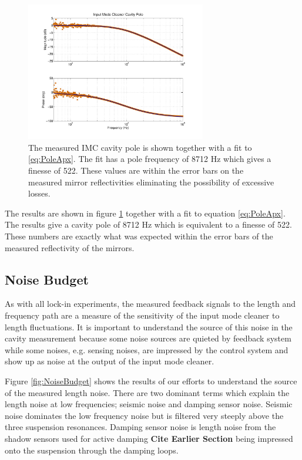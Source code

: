 \begin{figure}[ht]
	\centering
	\includegraphics[width = 0.7\textwidth, trim = 2.5cm 1.5cm 2.5cm 1cm]{Cavity_Pole.pdf}
	\caption{The measured IMC cavity pole is shown together with a fit 
		to \eqref{eq:PoleApx}.  The fit has a pole frequency of 8712 Hz 
		which gives a finesse of 522.  These values are within the error 
		bars on the measured mirror reflectivities eliminating the 
		possibility of excessive losses.}
	\label{fig:cavPole}
\end{figure}

The results are shown in figure \ref{fig:cavPole} together with a fit to equation 
\eqref{eq:PoleApx}.  The results give a cavity pole of 8712 Hz which is equivalent 
to a finesse of 522.  
These numbers are exactly what was expected within the error bars of the measured 
reflectivity of the mirrors.  

\subsection{Noise Budget}

As with all lock-in experiments, the measured feedback signals to the length and 
frequency path are a measure of the sensitivity of the input mode cleaner to length 
fluctuations.  
It is important to understand the source of this noise in the cavity measurement because 
some noise sources are quieted by feedback system while some noises, e.g. sensing noises, 
are impressed by the control system and show up
as noise at the output of the input mode cleaner.  

Figure \ref{fig:NoiseBudget} shows the results of our efforts to understand the source 
of the measured length noise.  
There are two dominant terms which explain the length noise at low frequencies; 
seismic noise and damping sensor noise.  
Seismic noise dominates the low frequency noise but is filtered very steeply above the 
three suspension resonances.  
Damping sensor noise is length noise from the shadow sensors used for active damping
\textbf{Cite Earlier Section} being impressed onto the suspension through the damping loops.  

